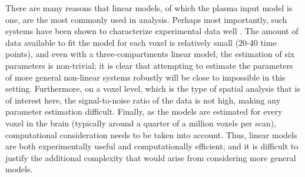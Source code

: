 There are many reasons that linear \ode models, of which the plasma input model is one, are the most commonly used in \pet analysis. Perhaps most importantly, such systems have been shown to characterize \pet experimental data well \cite{Lammertsma96}. The amount of data available to fit the model for each voxel is relatively small (20-40 time points), and even with a three-compartments linear \ode model, the estimation of six parameters is non-trivial; it is clear that attempting to estimate the parameters of more general non-linear \ode systems robustly will be close to impossible in this setting. Furthermore, on a voxel level, which is the type of spatial analysis that is of interest here, the signal-to-noise ratio of the data is not high, making any parameter estimation difficult. Finally, as the models are estimated for every voxel in the brain (typically around a quarter of a million voxels per scan), computational consideration needs to be taken into account. Thus, linear \ode models are both experimentally useful and computationally efficient; and it is difficult to justify the additional complexity that would arise from considering more general models.



